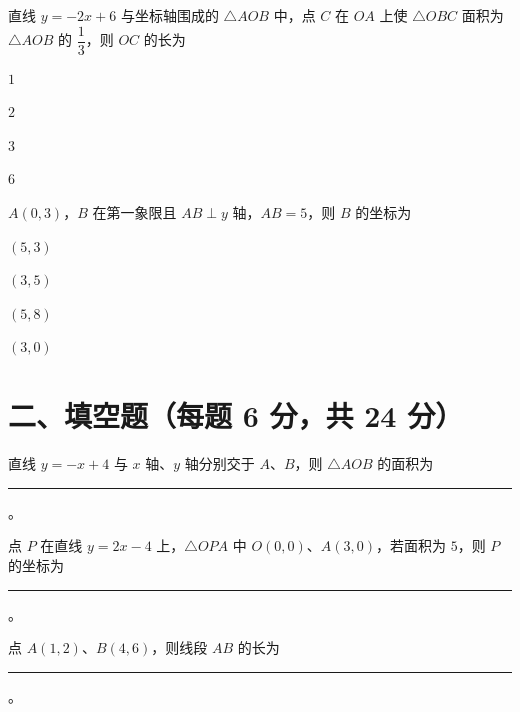 \documentclass{exam-zh}
\begin{document}
\begin{question}[points=6]
  直线 $y=-2x+6$ 与坐标轴围成的 $\triangle AOB$ 中，点 $C$ 在 $OA$ 上使 $\triangle OBC$ 面积为 $\triangle AOB$ 的 $\dfrac{1}{3}$，则 $OC$ 的长为
  \begin{choices}
    \item $1$
    \item $2$
    \item $3$
    \item $6$
  \end{choices}
  \paren[A]
\end{question}



\begin{question}[points=6]
  $A(0,3)$，$B$ 在第一象限且 $AB \perp y$ 轴，$AB=5$，则 $B$ 的坐标为
  \begin{choices}
    \item $(5, 3)$
    \item $(3, 5)$
    \item $(5, 8)$
    \item $(3, 0)$
  \end{choices}
  \paren[A]
\end{question}


\section*{二、填空题（每题 6 分，共 24 分）}



\begin{question}[points=6]
  直线 $y=-x+4$ 与 $x$ 轴、$y$ 轴分别交于 $A$、$B$，则 $\triangle AOB$ 的面积为 \rule{3cm}{0.4pt}。
  \fillin
  \paren[$8$]
\end{question}



\begin{question}[points=6]
  点 $P$ 在直线 $y=2x-4$ 上，$\triangle OPA$ 中 $O(0,0)$、$A(3,0)$，若面积为 $5$，则 $P$ 的坐标为 \rule{3cm}{0.4pt}。
  \fillin
\end{question}



\begin{question}[points=6]
  点 $A(1,2)$、$B(4,6)$，则线段 $AB$ 的长为 \rule{3cm}{0.4pt}。
  \fillin
  \paren[$5$]
\end{question}
\end{document}

